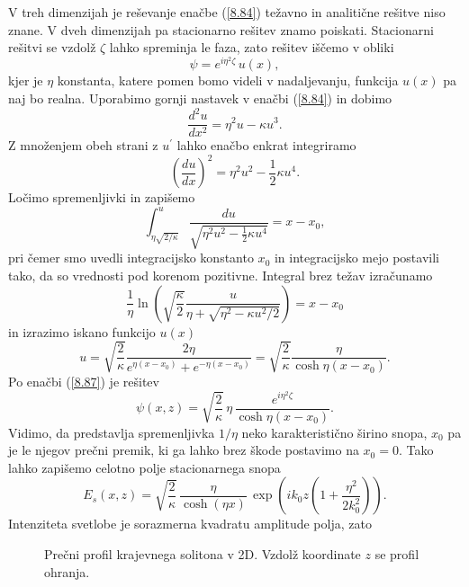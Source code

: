 V treh dimenzijah je reševanje enačbe (\ref{8.84}) težavno in analitične
rešitve niso znane. V dveh dimenzijah pa stacionarno rešitev znamo
poiskati. Stacionarni rešitvi se vzdolž $\zeta$ lahko spreminja le faza, zato
rešitev iščemo v obliki 
\begin{equation}
\psi=e^{i\eta^{2}\zeta}\, u(x),
\label{8.87}
\end{equation}
 kjer je $\eta$ konstanta, katere pomen bomo videli v nadaljevanju, 
 funkcija $u(x)$ pa naj bo realna. 
Uporabimo gornji nastavek v enačbi (\ref{8.84}) in dobimo
\begin{equation}
\frac{d^{2}u}{dx^{2}}=\eta^{2}u-\kappa u^{3}.
\end{equation}
 Z množenjem obeh strani z $u^{\prime}$ lahko enačbo enkrat integriramo
\begin{equation}
\left(\frac{du}{dx}\right)^{2}=\eta^{2}u^{2}-\frac{1}{2}\kappa u^{4}.
\end{equation}
Ločimo spremenljivki in zapišemo 
\begin{equation}
\int_{\eta\sqrt{2/\kappa}}^{u}\frac{du}{\sqrt{\eta^{2}u^2-\frac{1}{2}\kappa u^{4}}}=x-x_{0},
\label{8.85}
\end{equation}
pri čemer smo uvedli integracijsko konstanto $x_{0}$ in integracijsko mejo postavili 
tako, da so vrednosti pod korenom pozitivne.
Integral brez težav izračunamo
\begin{equation}
\frac{1}{\eta}\ln\left(\sqrt{\frac{\kappa}{2}}\frac{u}{\eta+
\sqrt{\eta^{2}-\kappa u^{2}/2}}\right)=x-x_{0}
\end{equation}
in izrazimo iskano funkcijo $u(x)$
\begin{equation}
u=\sqrt{\frac{2}{\kappa}}\frac{2 \eta }{e^{\eta(x-x_{0})}+e^{-\eta(x-x_{0})}}=
\sqrt{\frac{2}{\kappa}}\frac{\eta}{\cosh\eta(x-x_{0})}.
\label{8.86}
\end{equation}
Po enačbi (\ref{8.87}) je rešitev
\begin{equation}
\psi(x,z)=\sqrt{\frac{2}{\kappa}}\,\eta\,\frac{e^{i\eta^{2}\zeta}}{\cosh\eta(x-x_{0})}.
\label{8.88}
\end{equation}
Vidimo, da predstavlja spremenljivka $1/\eta$ neko karakteristično širino snopa, $x_{0}$ pa
je le njegov prečni premik, ki ga lahko brez škode postavimo na $x_0=0$. Tako
lahko zapišemo celotno polje stacionarnega snopa 
\begin{equation}
E_{s}(x,z)=\sqrt{\frac{2}{\kappa}}\,\frac{\eta}{\cosh(\eta x)}\,\exp\left(ik_{0}z\left(1+
\frac{\eta^{2}}{2k_{0}^{2}}\right)\right).
\label{8.89}
\end{equation}
Intenziteta svetlobe je sorazmerna kvadratu amplitude polja, zato 
\begin{figure}[h]
\centering
\def\svgwidth{100truemm} 

\caption{Prečni profil krajevnega solitona v 2D. Vzdolž koordinate $z$ se profil ohranja.}
\label{fig:soliton}
\end{figure}

